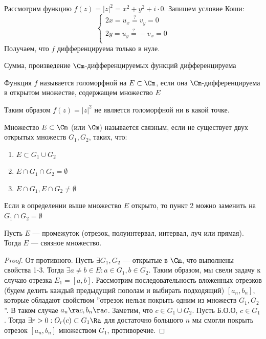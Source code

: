 \begin{example}
    Рассмотрим функцию \(f(z) = |z|^2 = x^2 + y^2 + i \cdot 0\). Запишем условие Коши:
    \[\left\{\begin{array}{l}
        2x = u_x \stackrel{?}{=} v_y = 0 \\
        2y = u_y \stackrel{?}{=} -v_x = 0 \\
    \end{array}\right.\]
    Получаем, что \(f\) дифференцируема только в нуле.
\end{example}

\begin{note}
    Сумма, произведение \(\Cm\)-дифференцируемых функций дифференцируема
\end{note}

\begin{definition}
    Функция \(f\) называется голоморфной на \(E \subset \Cm\), если она \(\Cm\)-дифференцируема в открытом множестве, содержащем множество \(E\)
\end{definition}

\begin{note}
    Таким образом \(f(z) = |z|^2\) не является голоморфной ни в какой точке.
\end{note}

\begin{definition}
    Множество \(E \subset \Cm\) (или \(\Cm\)) называется связным, если не существует двух открытых множеств \(G_1, G_2\), таких, что:
    \begin{enumerate}
        \item \(E \subset G_1 \cup G_2\)
        \item \(E \cap G_1 \cap G_2 = \emptyset\)
        \item \(E \cap G_1, E \cap G_2 \ne \emptyset\)
    \end{enumerate}
\end{definition}

\begin{note}
    Если в определении выше множество \(E\) открыто, то пункт 2 можно заменить на \(G_1 \cap G_2 = \emptyset\)
\end{note}

\begin{proposition}
    Пусть \(E\) --- промежуток (отрезок, полуинтервал, интервал, луч или прямая). Тогда \(E\) --- связное множество.
\end{proposition}
\begin{proof}
    От противного. Пусть \(\exists G_1, G_2\) --- открытые в \(\Cm\), что выполнены свойства 1-3. Тогда \(\exists a \ne b \in E: a \in G_1, b \in G_2\). Таким образом, мы свели задачу к случаю отрезка \(E_1 = [a, b]\). Рассмотрим последовательность вложенных отрезков (будем делить каждый предыдущий пополам и выбирать подходящий) \([a_n, b_n]\), которые обладают свойством ''отрезок нельзя покрыть одним из множеств \(G_1, G_2\)''. В таком случае \(a_n \ra c, b_n \ra c\). Заметим, что \(c \in G_1 \cup G_2\). Пусть Б.О.О, \(c \in G_1\). Тогда \(\exists r > 0: O_r(c) \subset G_1 \Ra \) для достаточно большого \(n\) мы смогли покрыть отрезок \([a_n, b_n]\) множеством \(G_1\), противоречие.
\end{proof}

